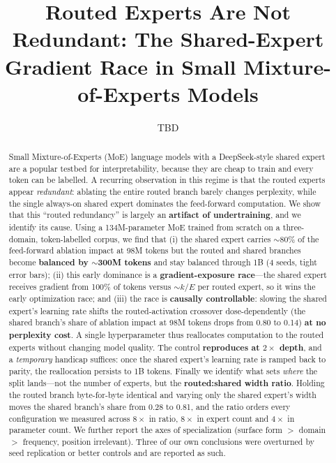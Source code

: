 \documentclass[11pt]{article}
\title{Routed Experts Are Not Redundant: The Shared-Expert\\ Gradient Race in Small Mixture-of-Experts Models}
\author{TBD}
\date{}
\begin{document}
\maketitle

\begin{abstract}
Small Mixture-of-Experts (MoE) language models with a DeepSeek-style shared expert are a popular
testbed for interpretability, because they are cheap to train and every token can be labelled. A
recurring observation in this regime is that the routed experts appear \emph{redundant}: ablating
the entire routed branch barely changes perplexity, while the single always-on shared expert
dominates the feed-forward computation. We show that this ``routed redundancy'' is largely an
\textbf{artifact of undertraining}, and we identify its cause. Using a 134M-parameter MoE trained
from scratch on a three-domain, token-labelled corpus, we find that (i) the shared expert carries
$\sim$80\% of the feed-forward ablation impact at 98M tokens but the routed and shared branches
become \textbf{balanced by $\sim$300M tokens} and stay balanced through 1B (4 seeds, tight error
bars); (ii) this early dominance is a \textbf{gradient-exposure race}---the shared expert receives
gradient from 100\% of tokens versus $\sim\!k/E$ per routed expert, so it wins the early
optimization race; and (iii) the race is \textbf{causally controllable}: slowing the shared
expert's learning rate shifts the routed-activation crossover dose-dependently (the shared
branch's share of ablation impact at 98M tokens drops from 0.80 to 0.14) \textbf{at no perplexity
cost}. A single hyperparameter thus reallocates computation to the routed experts without changing
model quality. The control \textbf{reproduces at $2\times$ depth}, and a \emph{temporary} handicap
suffices: once the shared expert's learning rate is ramped back to parity, the reallocation
persists to 1B tokens. Finally we identify what sets \emph{where} the split lands---not the number
of experts, but the \textbf{routed:shared width ratio}. Holding the routed branch byte-for-byte
identical and varying only the shared expert's width moves the shared branch's share from 0.28 to
0.81, and the ratio orders every configuration we measured across $8\times$ in ratio, $8\times$ in
expert count and $4\times$ in parameter count. We further report the axes of specialization
(surface form $>$ domain $>$ frequency, position irrelevant). Three of our own conclusions were
overturned by seed replication or better controls and are reported as such.
\end{abstract}
\end{document}
